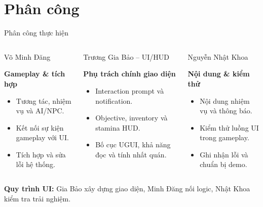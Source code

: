 \documentclass[aspectratio=169,10pt]{beamer}
\begin{document}
\section{Phân công}
\begin{frame}{Phân công thực hiện}
  \begin{columns}[T,onlytextwidth]
    \begin{block}{Võ Minh Đăng}
      \begin{minipage}[t][.35\textheight][t]{\linewidth}
        \small
        \textbf{Gameplay \& tích hợp}
        \begin{itemize}
          \item Tương tác, nhiệm vụ và AI/NPC.
          \item Kết nối sự kiện gameplay với UI.
          \item Tích hợp và sửa lỗi hệ thống.
        \end{itemize}
      \end{minipage}
    \end{block}

    \begin{alertblock}{Trương Gia Bảo -- UI/HUD}
      \begin{minipage}[t][.35\textheight][t]{\linewidth}
        \small
        \textbf{Phụ trách chính giao diện}
        \begin{itemize}
          \item Interaction prompt và notification.
          \item Objective, inventory và stamina HUD.
          \item Bố cục UGUI, khả năng đọc và tính nhất quán.
        \end{itemize}
      \end{minipage}
    \end{alertblock}

    \begin{block}{Nguyễn Nhật Khoa}
      \begin{minipage}[t][.35\textheight][t]{\linewidth}
        \small
        \textbf{Nội dung \& kiểm thử}
        \begin{itemize}
          \item Nội dung nhiệm vụ và thông báo.
          \item Kiểm thử luồng UI trong gameplay.
          \item Ghi nhận lỗi và chuẩn bị demo.
        \end{itemize}
      \end{minipage}
    \end{block}
  \end{columns}

  \vspace{0.15cm}
  \small\centering
  \textbf{Quy trình UI:} Gia Bảo xây dựng giao diện, Minh Đăng nối logic, Nhật Khoa kiểm tra trải nghiệm.
\end{frame}
\end{document}

